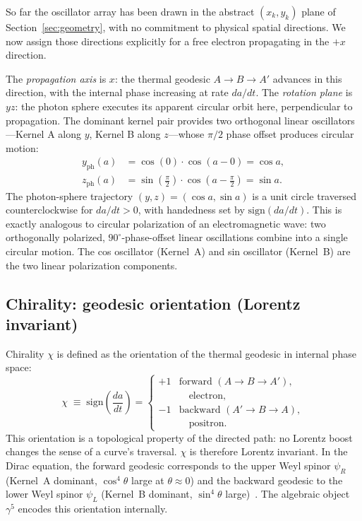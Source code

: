 \documentclass[%
 reprint, amsmath,amssymb, aps, prb, ]{revtex4-2}
\numberwithin{equation}{section}
\newcommand{\iphase}{\theta}
\begin{document}
So far the oscillator array has been drawn in the abstract $(x_k, y_k)$ plane of Section~\ref{sec:geometry}, with no commitment to physical spatial directions.
We now assign those directions explicitly for a free electron propagating in the $+x$ direction.

The \emph{propagation axis} is $x$: the thermal geodesic $A\to B\to A'$ advances in this direction, with the internal phase increasing at rate $da/dt$.
The \emph{rotation plane} is $yz$: the photon sphere executes its apparent circular orbit here, perpendicular to propagation.
The dominant kernel pair provides two orthogonal linear oscillators---Kernel A along $y$, Kernel B along $z$---whose $\pi/2$ phase offset produces circular motion:
\begin{align}
y_{\text{ph}}(a) &= \cos(0)\cdot\cos(a - 0) = \cos a, \label{eq:yph}\\
z_{\text{ph}}(a) &= \sin\!\left(\tfrac{\pi}{2}\right)\cdot\cos\!\left(a - \tfrac{\pi}{2}\right) = \sin a. \label{eq:zph}
\end{align}
The photon-sphere trajectory $(y,z)=(\cos a, \sin a)$ is a unit circle traversed counterclockwise for $da/dt > 0$, with handedness set by $\text{sign}(da/dt)$.
This is exactly analogous to circular polarization of an electromagnetic wave: two orthogonally polarized, $90^{\circ}$-phase-offset linear oscillations combine into a single circular motion.
The cos oscillator (Kernel~A) and sin oscillator (Kernel~B) are the two linear polarization components.

\subsection{Chirality: geodesic orientation (Lorentz invariant)}
\label{subsec:chirality_def}

Chirality $\chi$ is defined as the orientation of the thermal geodesic in internal phase space:
\begin{equation}
\chi \;\equiv\; \text{sign}\!\left(\frac{da}{dt}\right)
= \begin{cases}
+1 & \text{forward } (A\to B\to A'), \\
   & \quad \text{electron,}\\[4pt]
-1 & \text{backward } (A'\to B\to A), \\
   & \quad \text{positron.}
\end{cases}
\label{eq:chirality_def}
\end{equation}
This orientation is a topological property of the directed path: no Lorentz boost changes the sense of a curve's traversal.
$\chi$ is therefore Lorentz invariant.
In the Dirac equation, the forward geodesic corresponds to the upper Weyl spinor $\psi_R$ (Kernel~A dominant, $\cos^4\iphase$ large at $\iphase\approx 0$) and the backward geodesic to the lower Weyl spinor $\psi_L$ (Kernel~B dominant, $\sin^4\iphase$ large)~\cite{hanamura07}.
The algebraic object $\gamma^5$ encodes this orientation internally.
\end{document}
